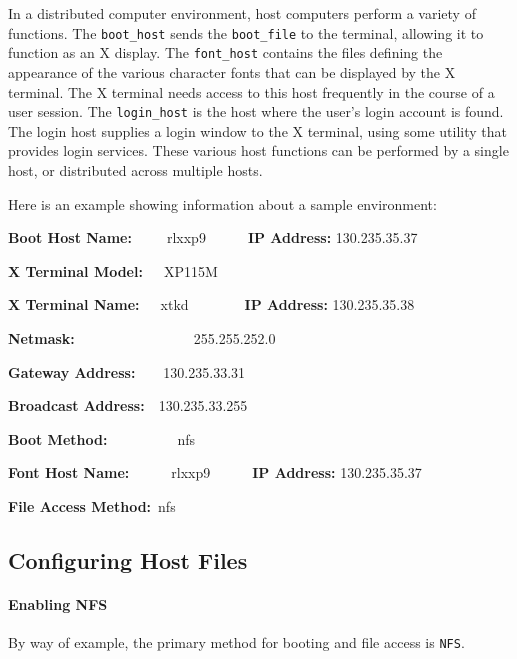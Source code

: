 \documentclass[11pt]{article}
\begin{document}
In a distributed computer environment, host computers perform a variety of
functions. The {\tt boot\_host} sends the {\tt boot\_file} to the terminal,
allowing it to function as an X display. The {\tt font\_host} contains the
files defining the appearance of the various character fonts that can be
displayed by the X terminal. The X terminal needs access to this host
frequently in the course of a user session. The {\tt login\_host} is the host
where the user's login account is found. The login host supplies a login window
to the X terminal, using some utility that provides login services. These
various host functions can be performed by a single host, or distributed across
multiple hosts.

Here is an example showing information about a sample environment:

{\bf Boot Host Name:}\ \ \ \ \ rlxxp9\ \ \ \ \ \ {\bf IP Address:} 130.235.35.37

{\bf X Terminal Model:}\ \ \ XP115M

{\bf X Terminal Name:}\ \ \ xtkd\ \ \ \ \ \ \ \ {\bf IP Address:} 130.235.35.38

{\bf Netmask:}\ \ \ \ \ \ \ \ \ \ \ \ \ \ \ \ \ 255.255.252.0

{\bf Gateway Address:}\ \ \ \ 130.235.33.31

{\bf Broadcast Address:}\ \ 130.235.33.255

{\bf Boot Method:}\ \ \ \ \ \ \ \ \ \ nfs

{\bf Font Host Name:}\ \ \ \ \ \ rlxxp9\ \ \ \ \ \ {\bf IP Address:} 130.235.35.37

{\bf File Access Method:}\ nfs


\subsection {Configuring Host Files}

\paragraph {Enabling NFS} By way of example, the primary method for booting and
file access is {\tt NFS}.
\end{document}
